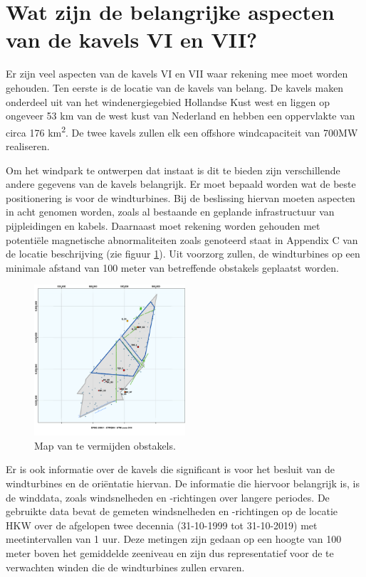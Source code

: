 \section{Wat zijn de belangrijke aspecten van de kavels VI en VII?} \label{Wat zijn de belangrijke aspecten van de Kavels VI en VII?}

Er zijn veel aspecten van de kavels VI en VII waar rekening mee moet worden gehouden. Ten eerste is de locatie van de kavels van belang. De kavels maken onderdeel uit van het windenergiegebied Hollandse Kust west en liggen op ongeveer 53 km van de west kust van Nederland en hebben een oppervlakte van circa 176 km\textsuperscript{2}.\cite{SiteDescriptionRVO} De twee kavels zullen elk een \gls{offshore} windcapaciteit van 700MW realiseren.\cite{SiteDescriptionRVO}\cite{Functies&gebruikHKW}

Om het windpark te ontwerpen dat instaat is dit te bieden zijn verschillende andere gegevens van de kavels belangrijk. Er moet bepaald worden wat de beste positionering is voor de windturbines. Bij de beslissing hiervan moeten aspecten in acht genomen worden, zoals al bestaande en geplande infrastructuur van pijpleidingen en kabels. Daarnaast moet rekening worden gehouden met potentiële magnetische abnormaliteiten zoals genoteerd staat in Appendix C van de locatie beschrijving (zie figuur \ref{fig:obstakels}).\cite{SiteDescriptionRVO}\cite{AppendixC} Uit voorzorg zullen, de windturbines op een minimale afstand van 100 meter van betreffende obstakels geplaatst worden.
\begin{figure}[h]
\centering
\includegraphics[width=0.5\textwidth]{IMG/data/overzicht/Map_obstakels.png} 
\caption{Map van te vermijden obstakels.}
\label{fig:obstakels}
\end{figure}

Er is ook informatie over de kavels die significant is voor het besluit van de windturbines en de oriëntatie hiervan. De informatie die hiervoor belangrijk is, is de winddata, zoals windsnelheden en -richtingen over langere periodes. De gebruikte data bevat de gemeten windsnelheden en -richtingen op de locatie HKW over de afgelopen twee decennia (31-10-1999 tot 31-10-2019) met meetintervallen van 1 uur.\cite{WindData} \cite{WindResourceAssessment} 
Deze metingen zijn gedaan op een hoogte van 100 meter boven het gemiddelde zeeniveau en zijn dus representatief voor de te verwachten winden die de windturbines zullen ervaren. 

